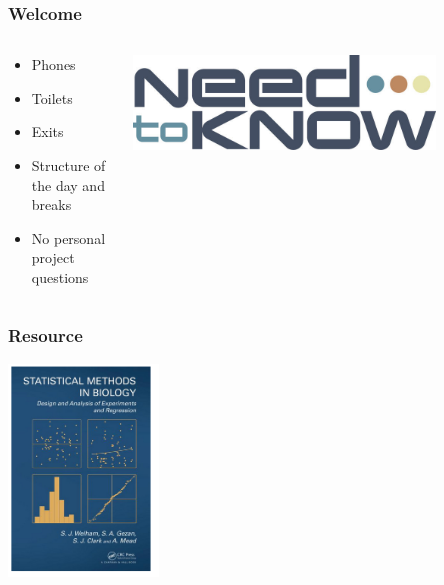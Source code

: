 \begin{frame}\frametitle{Welcome}


\begin{columns}
\begin{column}{0.5\textwidth}
\begin{itemize}
  \item Phones
  \item Toilets
  \item Exits
  \item Structure of the day and breaks
  \item No personal project questions
\end{itemize}
\end{column}
\begin{column}{0.5\textwidth}
    \begin{center}
     \includegraphics[width=0.8\textwidth]{need2know}
     \end{center}
\end{column}
\end{columns}


\end{frame}



\begin{frame}\frametitle{Resource}
\centering
\includegraphics[width=0.3\textwidth]{welham}
\end{frame}


